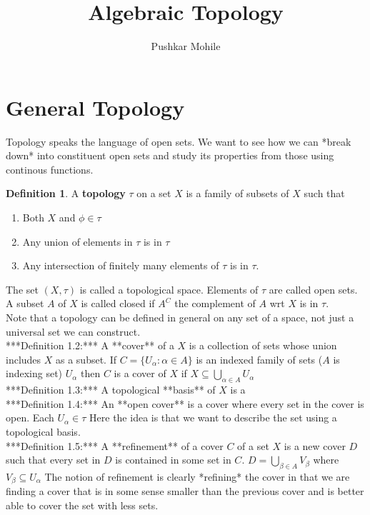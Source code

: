 \documentclass{article}
\title{Algebraic Topology}
\author{Pushkar Mohile}
\theoremstyle{definition}
\newtheorem{definition}{Definition}[section]
\theoremstyle{remark}
\begin{document}
\maketitle
\section{General Topology}    

Topology speaks the language of open sets. 
We want to see how we can *break down* into constituent open sets and
 study its properties from those using continous functions.  
\begin{definition}
    A \textbf{topology} $\tau$ on a set $X$ is a family of subsets of $X$ such that  
    \begin{enumerate}
        \item Both $X$ and $\phi \in \tau$
        \item Any union of elements in $\tau$ is in $\tau$
        \item  Any intersection of finitely many elements of $\tau$ is in $\tau$. 
    \end{enumerate}
\end{definition}
The set $(X,\tau)$ is called a topological space. Elements of $\tau$ are called open sets. A subset $A$ of $X$ is 
called closed if $A^C$ the complement of $A$ wrt $X$ is in $\tau$.  \\
Note that a topology can be defined in general on any set of a space, not just a universal set we can construct.   
\\
***Definition 1.2:*** A **cover** of a $X$ is a collection of sets whose union includes $X$ as a subset.   
If $C = \{U_\alpha: \alpha \in A \}$ is an indexed family of sets ($A$ is indexing set) $U_\alpha$ then $C$ is a cover of $X$ if $X\subseteq\bigcup_{\alpha\in A}U_\alpha$   
\\
***Definition 1.3:*** A topological **basis** of $X$ is a  
\\
***Definition 1.4:*** An **open cover** is a cover where every set in the cover is open. Each $U_\alpha \in \tau$  
Here the idea is that we want to describe the set using a topological basis.   
\\
***Definition 1.5:*** A **refinement** of a cover $C$ of a set $X$ is a new cover $D$ such that every set in $D$ is contained in some set in $C$. $D = \bigcup_{\beta \in A} V_\beta$ where $V_\beta \subseteq U_\alpha$  
The notion of refinement is clearly *refining* the cover in that we are finding a cover that is in some sense smaller than the previous cover and is better able to cover the set with less sets.  
\end{document}
